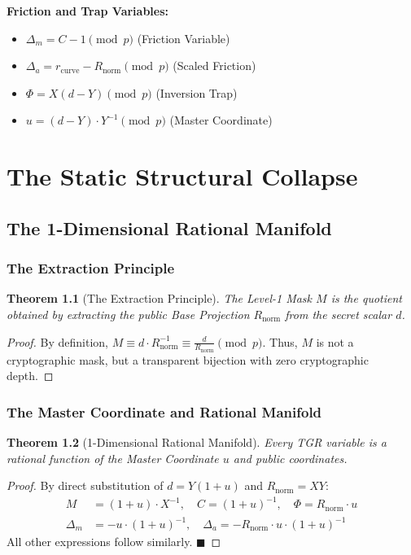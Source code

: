 \documentclass[11pt, a4paper, twoside]{book}
\newtheorem{theorem}{Theorem}[chapter]
\begin{document}
\textbf{Friction and Trap Variables:}
\begin{itemize}
    \item $\Delta_m = C - 1 \pmod p$ (Friction Variable)
    \item $\Delta_a = r_{\text{curve}} - R_{\text{norm}} \pmod p$ (Scaled Friction)
    \item $\Phi = X(d - Y) \pmod p$ (Inversion Trap)
    \item $u = (d - Y) \cdot Y^{-1} \pmod p$ (Master Coordinate)
\end{itemize}

\part{The Static Structural Collapse}

\chapter{The 1-Dimensional Rational Manifold}

\section{The Extraction Principle}
\begin{theorem}[The Extraction Principle]
The Level-1 Mask $M$ is the quotient obtained by extracting the public Base Projection $R_{\text{norm}}$ from the secret scalar $d$.
\end{theorem}
\begin{proof}
By definition, $M \equiv d \cdot R_{\text{norm}}^{-1} \equiv \frac{d}{R_{\text{norm}}} \pmod p$. Thus, $M$ is not a cryptographic mask, but a transparent bijection with zero cryptographic depth.
\end{proof}

\section{The Master Coordinate and Rational Manifold}
\begin{theorem}[1-Dimensional Rational Manifold]
Every TGR variable is a rational function of the Master Coordinate $u$ and public coordinates.
\end{theorem}
\begin{proof}
By direct substitution of $d = Y(1+u)$ and $R_{\text{norm}} = XY$:
\begin{align*}
    M &= (1 + u) \cdot X^{-1}, \quad C = (1 + u)^{-1}, \quad \Phi = R_{\text{norm}} \cdot u \\
    \Delta_m &= -u \cdot (1 + u)^{-1}, \quad \Delta_a = -R_{\text{norm}} \cdot u \cdot (1 + u)^{-1}
\end{align*}
All other expressions follow similarly. $\blacksquare$
\end{proof}
\end{document}
